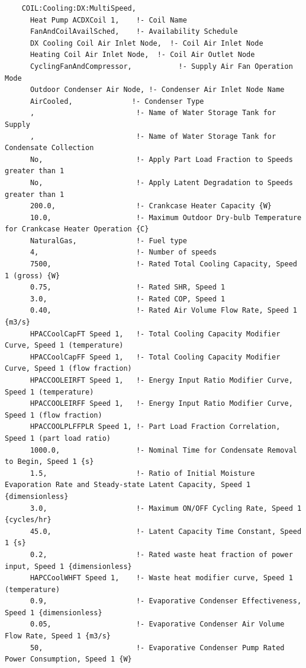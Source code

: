 \begin{lstlisting}
    COIL:Cooling:DX:MultiSpeed,
      Heat Pump ACDXCoil 1,    !- Coil Name
      FanAndCoilAvailSched,    !- Availability Schedule
      DX Cooling Coil Air Inlet Node,  !- Coil Air Inlet Node
      Heating Coil Air Inlet Node,  !- Coil Air Outlet Node
      CyclingFanAndCompressor,           !- Supply Air Fan Operation Mode
      Outdoor Condenser Air Node, !- Condenser Air Inlet Node Name
      AirCooled,              !- Condenser Type
      ,                        !- Name of Water Storage Tank for Supply
      ,                        !- Name of Water Storage Tank for Condensate Collection
      No,                      !- Apply Part Load Fraction to Speeds greater than 1
      No,                      !- Apply Latent Degradation to Speeds greater than 1
      200.0,                   !- Crankcase Heater Capacity {W}
      10.0,                    !- Maximum Outdoor Dry-bulb Temperature for Crankcase Heater Operation {C}
      NaturalGas,              !- Fuel type
      4,                       !- Number of speeds
      7500,                    !- Rated Total Cooling Capacity, Speed 1 (gross) {W}
      0.75,                    !- Rated SHR, Speed 1
      3.0,                     !- Rated COP, Speed 1
      0.40,                    !- Rated Air Volume Flow Rate, Speed 1 {m3/s}
      HPACCoolCapFT Speed 1,   !- Total Cooling Capacity Modifier Curve, Speed 1 (temperature)
      HPACCoolCapFF Speed 1,   !- Total Cooling Capacity Modifier Curve, Speed 1 (flow fraction)
      HPACCOOLEIRFT Speed 1,   !- Energy Input Ratio Modifier Curve, Speed 1 (temperature)
      HPACCOOLEIRFF Speed 1,   !- Energy Input Ratio Modifier Curve, Speed 1 (flow fraction)
      HPACCOOLPLFFPLR Speed 1, !- Part Load Fraction Correlation, Speed 1 (part load ratio)
      1000.0,                  !- Nominal Time for Condensate Removal to Begin, Speed 1 {s}
      1.5,                     !- Ratio of Initial Moisture Evaporation Rate and Steady-state Latent Capacity, Speed 1 {dimensionless}
      3.0,                     !- Maximum ON/OFF Cycling Rate, Speed 1 {cycles/hr}
      45.0,                    !- Latent Capacity Time Constant, Speed 1 {s}
      0.2,                     !- Rated waste heat fraction of power input, Speed 1 {dimensionless}
      HAPCCoolWHFT Speed 1,    !- Waste heat modifier curve, Speed 1 (temperature)
      0.9,                     !- Evaporative Condenser Effectiveness, Speed 1 {dimensionless}
      0.05,                    !- Evaporative Condenser Air Volume Flow Rate, Speed 1 {m3/s}
      50,                      !- Evaporative Condenser Pump Rated Power Consumption, Speed 1 {W}

\end{lstlisting}

